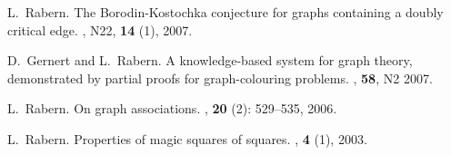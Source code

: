 \documentclass[10pt]{article}
\begin{document}
\begin{enumerate}[{[}1{]}]
\item
L.~Rabern.
\newblock The Borodin-Kostochka conjecture for graphs containing a doubly critical edge.
, N22, \textbf{14} (1), 2007.

\item
D.~Gernert and L.~Rabern.
\newblock A knowledge-based system for graph theory, demonstrated by partial proofs for graph-colouring problems.
, \textbf{58}, N2 2007.

\item L.~Rabern.
\newblock On graph associations.
, \textbf{20}  (2): 529--535,
  2006.

\item L.~Rabern.
\newblock Properties of magic squares of squares.
, \textbf{4}
  (1), 2003. 
\end{enumerate}
\end{document}
